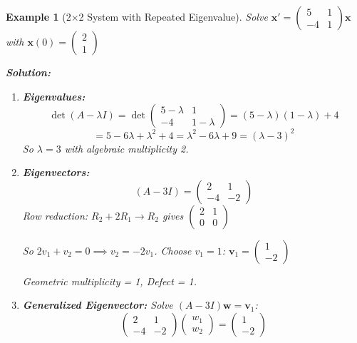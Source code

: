 \documentclass[12pt]{article}
\newtheorem{example}{Example}
\begin{document}
\begin{example}[2$\times$2 System with Repeated Eigenvalue]
Solve $\mathbf{x}' = \begin{pmatrix} 5 & 1 \\ -4 & 1 \end{pmatrix}\mathbf{x}$ with $\mathbf{x}(0) = \begin{pmatrix} 2 \\ 1 \end{pmatrix}$

\textbf{Solution:}
\begin{enumerate}
\item \textbf{Eigenvalues:}
\[\det(A - \lambda I) = \det\begin{pmatrix} 5-\lambda & 1 \\ -4 & 1-\lambda \end{pmatrix} = (5-\lambda)(1-\lambda) + 4\]
\[= 5 - 6\lambda + \lambda^{2} + 4 = \lambda^{2} - 6\lambda + 9 = (\lambda - 3)^{2}\]
So $\lambda = 3$ with algebraic multiplicity 2.

\item \textbf{Eigenvectors:}
\[(A - 3I) = \begin{pmatrix} 2 & 1 \\ -4 & -2 \end{pmatrix}\]
Row reduction: $R_{2} + 2R_{1} \to R_{2}$ gives $\begin{pmatrix} 2 & 1 \\ 0 & 0 \end{pmatrix}$

So $2v_{1} + v_{2} = 0 \implies v_{2} = -2v_{1}$. Choose $v_{1} = 1$: $\mathbf{v}_{1} = \begin{pmatrix} 1 \\ -2 \end{pmatrix}$

Geometric multiplicity = 1, Defect = 1.

\item \textbf{Generalized Eigenvector:}
Solve $(A - 3I)\mathbf{w} = \mathbf{v}_{1}$:
\[\begin{pmatrix} 2 & 1 \\ -4 & -2 \end{pmatrix}\begin{pmatrix} w_{1} \\ w_{2} \end{pmatrix} = \begin{pmatrix} 1 \\ -2 \end{pmatrix}\]


\end{enumerate}
\end{example}
\end{document}
